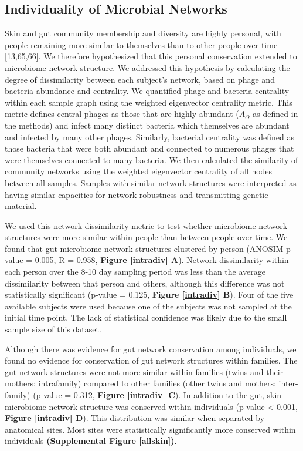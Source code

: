 \documentclass[12pt,]{article}
\begin{document}
\subsection{Individuality of Microbial
Networks}\label{individuality-of-microbial-networks}

Skin and gut community membership and diversity are highly personal,
with people remaining more similar to themselves than to other people
over time {[}13,65,66{]}. We therefore hypothesized that this personal
conservation extended to microbiome network structure. We addressed this
hypothesis by calculating the degree of dissimilarity between each
subject's network, based on phage and bacteria abundance and centrality.
We quantified phage and bacteria centrality within each sample graph
using the weighted eigenvector centrality metric. This metric defines
central phages as those that are highly abundant (\(A_{O}\) as defined
in the methods) and infect many distinct bacteria which themselves are
abundant and infected by many other phages. Similarly, bacterial
centrality was defined as those bacteria that were both abundant and
connected to numerous phages that were themselves connected to many
bacteria. We then calculated the similarity of community networks using
the weighted eigenvector centrality of all nodes between all samples.
Samples with similar network structures were interpreted as having
similar capacities for network robustness and transmitting genetic
material.

We used this network dissimilarity metric to test whether microbiome
network structures were more similar within people than between people
over time. We found that gut microbiome network structures clustered by
person (ANOSIM p-value = 0.005, R = 0.958, \textbf{Figure \ref{intradiv}
A}). Network dissimilarity within each person over the 8-10 day sampling
period was less than the average dissimilarity between that person and
others, although this difference was not statistically significant
(p-value = 0.125, \textbf{Figure \ref{intradiv} B}). Four of the five
available subjects were used because one of the subjects was not sampled
at the initial time point. The lack of statistical confidence was likely
due to the small sample size of this dataset.

Although there was evidence for gut network conservation among
individuals, we found no evidence for conservation of gut network
structures within families. The gut network structures were not more
similar within families (twins and their mothers; intrafamily) compared
to other families (other twins and mothers; inter-family) (p-value =
0.312, \textbf{Figure \ref{intradiv} C}). In addition to the gut, skin
microbiome network structure was conserved within individuals (p-value
\textless{} 0.001, \textbf{Figure \ref{intradiv} D}). This distribution
was similar when separated by anatomical sites. Most sites were
statistically significantly more conserved within individuals
\textbf{(Supplemental Figure \ref{allskin})}.
\end{document}
